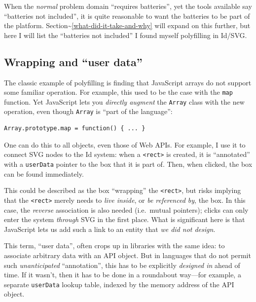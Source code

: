 When the \emph{normal} problem domain ``requires batteries'', yet the
tools available say ``batteries not included'', it is quite reasonable
to want the batteries to be part of the platform.
Section\textasciitilde{}\ref{what-did-it-take-and-why} will expand on
this further, but here I will list the ``batteries not included'' I
found myself polyfilling in Id{}/SVG.

\hypertarget{wrapping-and-user-data}{%
\subsection{Wrapping and ``user data''}\label{wrapping-and-user-data}}

The classic example of polyfilling is finding that JavaScript arrays do
not support some familiar operation. For example, this used to be the
case with the \texttt{map} function. Yet JavaScript lets you
\emph{directly augment} the \texttt{Array} class with the new operation,
even though \texttt{Array} is ``part of the language'':

\begin{lstlisting}
Array.prototype.map = function() { ... }
\end{lstlisting}

One can do this to all objects, even those of Web APIs. For example, I
use it to connect SVG nodes to the Id{} system: when a
\texttt{\textless{}rect\textgreater{}} is created, it is ``annotated''
with a \texttt{userData} pointer to the box that it is part of. Then,
when clicked, the box can be found immediately.

This could be described as the box ``wrapping'' the
\texttt{\textless{}rect\textgreater{}}, but risks implying that the
\texttt{\textless{}rect\textgreater{}} merely needs to \emph{live
inside}, or \emph{be referenced by}, the box. In this case, the
\emph{reverse} association is also needed (i.e.~mutual pointers); clicks
can only enter the system \emph{through} SVG in the first place. What is
significant here is that JavaScript lets us add such a link to an entity
that \emph{we did not design}.

This term, ``user data'', often crops up in libraries with the same
idea: to associate arbitrary data with an API object. But in languages
that do not permit such \emph{unanticipated} ``annotation'', this has to
be explicitly \emph{designed in} ahead of time. If it wasn't, then it
has to be done in a roundabout way---for example, a separate
\texttt{userData} lookup table, indexed by the memory address of the API
object.

